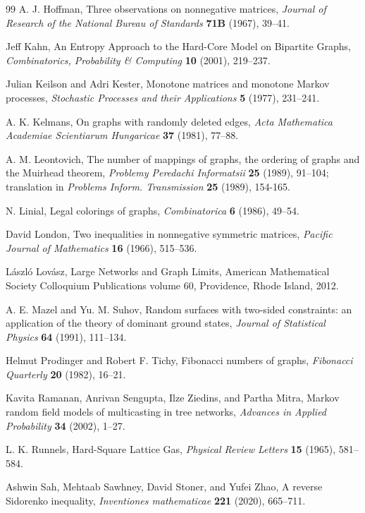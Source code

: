 \documentclass[11pt]{article}
\theoremstyle{definition}
\begin{document}
\begin{thebibliography}{99}
A. J. Hoffman, Three observations on nonnegative matrices, {\it Journal of Research of the National Bureau of Standards} {\bf 71B} (1967), 39--41.

Jeff Kahn, An Entropy Approach to the Hard-Core Model on Bipartite Graphs, {\it Combinatorics, Probability \& Computing} {\bf 10} (2001), 219--237.

Julian Keilson and Adri Kester, Monotone matrices and monotone Markov processes, {\it Stochastic Processes and their Applications} {\bf 5} (1977), 231--241.

A. K. Kelmans,
On graphs with randomly deleted edges, {\it 
Acta Mathematica Academiae Scientiarum Hungaricae} {\bf 37} (1981), 77--88.

A. M. Leontovich, The number of mappings of graphs, the ordering of graphs and the Muirhead theorem, {\it Problemy Peredachi Informatsii} {\bf 25} (1989), 91--104; translation in {\it Problems Inform. Transmission} {\bf 25} (1989), 154-165.

N. Linial, Legal colorings of graphs, {\it Combinatorica} {\bf 6} (1986), 49--54.

David London, Two inequalities in nonnegative symmetric matrices, {\it Pacific Journal of Mathematics} {\bf 16} (1966), 515--536.

L\'aszl\'o Lov\'asz, Large Networks and Graph Limits, American Mathematical Society Colloquium Publications volume 60, Providence, Rhode Island, 2012.

A. E. Mazel and Yu. M. Suhov, Random surfaces with two-sided constraints: an application of the theory of dominant ground states, {\it Journal of Statistical Physics} {\bf 64} (1991), 111--134.

Helmut Prodinger and Robert F. Tichy, Fibonacci numbers of graphs, {\it Fibonacci Quarterly} {\bf 20} (1982), 16--21.

Kavita Ramanan, Anrivan Sengupta, Ilze Ziedins, and Partha Mitra, Markov random field models of multicasting in tree networks, {\it Advances in Applied Probability} {\bf 34} (2002), 1--27.

L. K. Runnels, Hard-Square Lattice Gas, {\it Physical Review Letters} {\bf 15} (1965), 581--584. 

Ashwin Sah, Mehtaab Sawhney, David Stoner, and Yufei Zhao, A reverse Sidorenko inequality, {\it Inventiones mathematicae} {\bf 221} (2020), 665--711.


\end{thebibliography}
\end{document}
